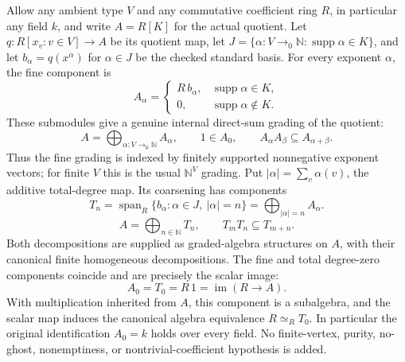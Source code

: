 \begin{proposition}\label{prop:grading}
\leanok
Allow any ambient type $V$ and any commutative coefficient ring $R$,
in particular any field $k$, and write $A=R[K]$ for the actual quotient.
Let $q:R[x_v:v\in V]\to A$ be its quotient map, let
$J=\{\alpha:V\to_0\mathbb N:\operatorname{supp}\alpha\in K\}$, and let
$b_\alpha=q(x^\alpha)$ for $\alpha\in J$ be the checked standard basis.
For every exponent $\alpha$, the fine component is
\[
 A_\alpha=
 \begin{cases}
 R\,b_\alpha,&\operatorname{supp}\alpha\in K,\\
 0,&\operatorname{supp}\alpha\notin K.
 \end{cases}
\]
These submodules give a genuine internal direct-sum grading of the quotient:
\[
 A=\bigoplus_{\alpha:V\to_0\mathbb N}A_\alpha,
 \qquad 1\in A_0,\qquad A_\alpha A_\beta\subseteq A_{\alpha+\beta}.
\]
Thus the fine grading is indexed by finitely supported nonnegative exponent
vectors; for finite $V$ this is the usual $\mathbb N^V$ grading.
Put $|\alpha|=\sum_v\alpha(v)$, the additive total-degree map. Its
coarsening has components
\[
 T_n=\operatorname{span}_R\{b_\alpha:\alpha\in J,\ |\alpha|=n\}
     =\bigoplus_{|\alpha|=n} A_\alpha.
\]
\[
 A=\bigoplus_{n\in\mathbb N}T_n,
 \qquad T_mT_n\subseteq T_{m+n}.
\]
Both decompositions are supplied as graded-algebra structures on $A$,
with their canonical finite homogeneous decompositions. The fine and total
degree-zero components coincide and are precisely the scalar image:
\[
 A_0=T_0=R\,1=\operatorname{im}(R\longrightarrow A).
\]
With multiplication inherited from $A$, this component is a subalgebra,
and the scalar map induces the canonical algebra equivalence
$R\simeq_R T_0$. In particular the original identification $A_0=k$ holds
over every field. No finite-vertex, purity, no-ghost, nonemptiness, or
nontrivial-coefficient hypothesis is added.
\end{proposition}
